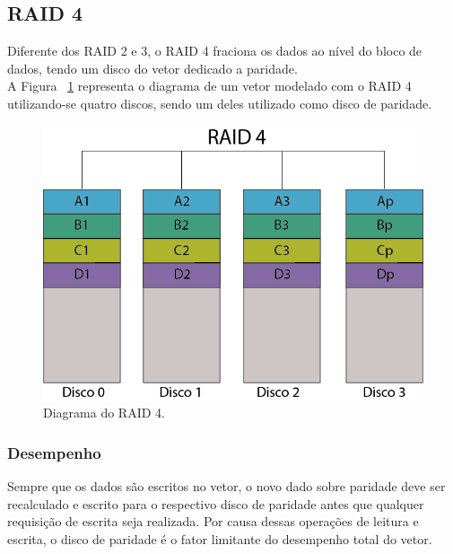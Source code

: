 \subsection{RAID 4}
Diferente dos RAID 2 e 3, o RAID 4 fraciona os dados ao nível do bloco de dados, tendo um disco do vetor dedicado a paridade. \\

A Figura ~\ref{fig:raid4} representa o diagrama de um vetor modelado com o RAID 4 utilizando-se quatro discos, sendo um deles utilizado como disco de paridade.\\

\begin{figure}[htb]
	\begin{center}
		
		\includegraphics[clip,scale=0.5]{images/RAID_4.png}
		\caption{Diagrama do RAID 4. }
		\label{fig:raid4}
	\end{center}
\end{figure} 

\subsubsection{Desempenho}
Sempre que os dados são escritos no vetor, o novo dado sobre paridade deve ser recalculado e escrito para o respectivo disco de paridade antes que qualquer requisição de escrita seja realizada. Por causa dessas operações de leitura e escrita, o disco de paridade é o fator limitante do desempenho total do vetor.\\

